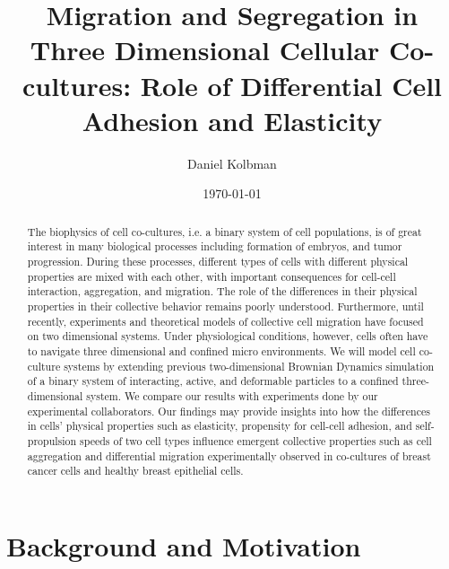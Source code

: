 \documentclass[aps,prb,twocolumn,groupedaddress,nofootinbib,floatfix]{revtex4}
\begin{document}
%
\title{Migration and Segregation in Three Dimensional Cellular Co-cultures: Role of
Differential Cell Adhesion and Elasticity}

%
\author{Daniel Kolbman}
%
%
%

\date{\today}

\begin{abstract} \noindent The biophysics of cell co-cultures, i.e. a binary system of cell populations, is of great interest in many biological processes including formation of embryos, and tumor progression. 
During these processes, different types of cells with different physical properties are mixed with each other, with important consequences for cell-cell interaction, aggregation, and migration. The role of the differences
in their physical properties in their collective behavior remains poorly understood. Furthermore, until recently, experiments and theoretical models of collective cell migration 
have focused on two dimensional systems. Under physiological conditions, however, cells often have to  
navigate three dimensional and confined micro environments. We will model cell co-culture systems by extending previous two-dimensional Brownian Dynamics simulation of a binary system of interacting, 
active, and deformable particles to a confined three-dimensional system. We compare our results with experiments done by our experimental collaborators. Our findings may 
provide insights into how the differences in cells' physical properties such as elasticity, propensity for cell-cell adhesion, and self-propulsion speeds of two cell types influence 
emergent collective properties such as cell aggregation and differential migration experimentally observed in co-cultures of breast cancer cells and healthy breast epithelial cells.  

\end{abstract}

\maketitle

\section{Background and Motivation}
\end{document}
